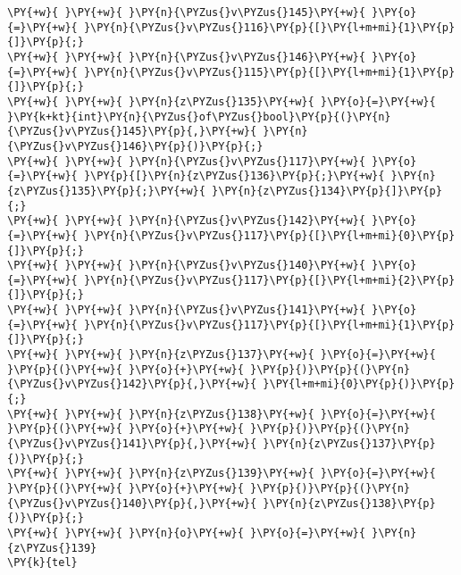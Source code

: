 \begin{Verbatim}[commandchars=\\\{\}]
\PY{+w}{ }\PY{+w}{ }\PY{n}{\PYZus{}v\PYZus{}145}\PY{+w}{ }\PY{o}{=}\PY{+w}{ }\PY{n}{\PYZus{}v\PYZus{}116}\PY{p}{[}\PY{l+m+mi}{1}\PY{p}{]}\PY{p}{;}
\PY{+w}{ }\PY{+w}{ }\PY{n}{\PYZus{}v\PYZus{}146}\PY{+w}{ }\PY{o}{=}\PY{+w}{ }\PY{n}{\PYZus{}v\PYZus{}115}\PY{p}{[}\PY{l+m+mi}{1}\PY{p}{]}\PY{p}{;}
\PY{+w}{ }\PY{+w}{ }\PY{n}{z\PYZus{}135}\PY{+w}{ }\PY{o}{=}\PY{+w}{ }\PY{k+kt}{int}\PY{n}{\PYZus{}of\PYZus{}bool}\PY{p}{(}\PY{n}{\PYZus{}v\PYZus{}145}\PY{p}{,}\PY{+w}{ }\PY{n}{\PYZus{}v\PYZus{}146}\PY{p}{)}\PY{p}{;}
\PY{+w}{ }\PY{+w}{ }\PY{n}{\PYZus{}v\PYZus{}117}\PY{+w}{ }\PY{o}{=}\PY{+w}{ }\PY{p}{[}\PY{n}{z\PYZus{}136}\PY{p}{;}\PY{+w}{ }\PY{n}{z\PYZus{}135}\PY{p}{;}\PY{+w}{ }\PY{n}{z\PYZus{}134}\PY{p}{]}\PY{p}{;}
\PY{+w}{ }\PY{+w}{ }\PY{n}{\PYZus{}v\PYZus{}142}\PY{+w}{ }\PY{o}{=}\PY{+w}{ }\PY{n}{\PYZus{}v\PYZus{}117}\PY{p}{[}\PY{l+m+mi}{0}\PY{p}{]}\PY{p}{;}
\PY{+w}{ }\PY{+w}{ }\PY{n}{\PYZus{}v\PYZus{}140}\PY{+w}{ }\PY{o}{=}\PY{+w}{ }\PY{n}{\PYZus{}v\PYZus{}117}\PY{p}{[}\PY{l+m+mi}{2}\PY{p}{]}\PY{p}{;}
\PY{+w}{ }\PY{+w}{ }\PY{n}{\PYZus{}v\PYZus{}141}\PY{+w}{ }\PY{o}{=}\PY{+w}{ }\PY{n}{\PYZus{}v\PYZus{}117}\PY{p}{[}\PY{l+m+mi}{1}\PY{p}{]}\PY{p}{;}
\PY{+w}{ }\PY{+w}{ }\PY{n}{z\PYZus{}137}\PY{+w}{ }\PY{o}{=}\PY{+w}{ }\PY{p}{(}\PY{+w}{ }\PY{o}{+}\PY{+w}{ }\PY{p}{)}\PY{p}{(}\PY{n}{\PYZus{}v\PYZus{}142}\PY{p}{,}\PY{+w}{ }\PY{l+m+mi}{0}\PY{p}{)}\PY{p}{;}
\PY{+w}{ }\PY{+w}{ }\PY{n}{z\PYZus{}138}\PY{+w}{ }\PY{o}{=}\PY{+w}{ }\PY{p}{(}\PY{+w}{ }\PY{o}{+}\PY{+w}{ }\PY{p}{)}\PY{p}{(}\PY{n}{\PYZus{}v\PYZus{}141}\PY{p}{,}\PY{+w}{ }\PY{n}{z\PYZus{}137}\PY{p}{)}\PY{p}{;}
\PY{+w}{ }\PY{+w}{ }\PY{n}{z\PYZus{}139}\PY{+w}{ }\PY{o}{=}\PY{+w}{ }\PY{p}{(}\PY{+w}{ }\PY{o}{+}\PY{+w}{ }\PY{p}{)}\PY{p}{(}\PY{n}{\PYZus{}v\PYZus{}140}\PY{p}{,}\PY{+w}{ }\PY{n}{z\PYZus{}138}\PY{p}{)}\PY{p}{;}
\PY{+w}{ }\PY{+w}{ }\PY{n}{o}\PY{+w}{ }\PY{o}{=}\PY{+w}{ }\PY{n}{z\PYZus{}139}
\PY{k}{tel}
\end{Verbatim}
